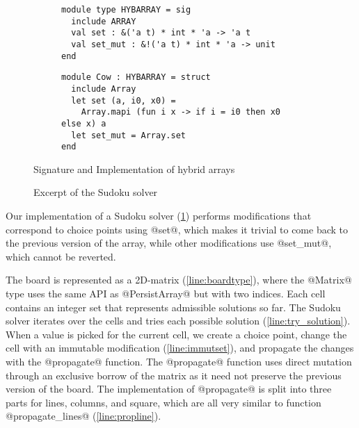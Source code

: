 \begin{figure}[tp]
  \centering
  \begin{subfigure}[t]{0.45\linewidth}
\begin{lstlisting}
module type HYBARRAY = sig
  include ARRAY
  val set : &('a t) * int * 'a -> 'a t
  val set_mut : &!('a t) * int * 'a -> unit
end
\end{lstlisting}
  \end{subfigure}\hfill
  \begin{subfigure}[t]{0.55\linewidth}
\begin{lstlisting}
module Cow : HYBARRAY = struct
  include Array
  let set (a, i0, x0) =
    Array.mapi (fun i x -> if i = i0 then x0 else x) a
  let set_mut = Array.set
end
\end{lstlisting}
  \end{subfigure}
  \vspace{-15pt}
  \caption{Signature and Implementation of hybrid arrays}
  \label{sig:hybarray}
  \label{ex:cow}

  \begin{subfigure}[t]{0.45\linewidth}
  
  \end{subfigure}\hfill
  \begin{subfigure}[t]{0.55\linewidth}
  
  \end{subfigure}
  \vspace{-15pt}
  \caption{Excerpt of the Sudoku solver}
  \label{ex:sudoku}
\end{figure}

Our implementation of a Sudoku solver (\cref{ex:sudoku}) performs
modifications that correspond to choice points using @set@,
which makes it trivial to come back to the previous version
of the array, while other modifications use @set_mut@, which
cannot be reverted.

The board is represented as a 2D-matrix (\cref{line:boardtype}), where
the @Matrix@ type uses the same API as @PersistArray@
but with two indices.
Each cell contains an integer set that represents admissible solutions so far.
The Sudoku solver iterates over the cells and tries each possible solution (\cref{line:try_solution}).
When a value is picked for the current cell, we create a choice point,
change the cell with an immutable modification (\cref{line:immutset}), and propagate
the changes with the @propagate@ function.
The @propagate@ function uses direct mutation through an
exclusive borrow of the matrix as it need not preserve the previous
version of the board.
The implementation of @propagate@ is split into three parts
for lines, columns, and square, which are all very similar to function
@propagate_lines@ (\cref{line:propline}).


